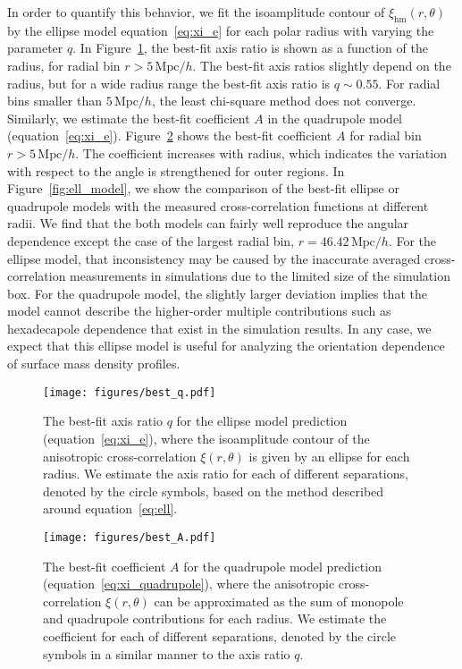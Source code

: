 \documentclass[a4paper,fleqn,usenatbib]{mnras}
\newcommand{\Mpc}{\mathrm{Mpc}}
\newcommand{\rmhm}{\mathrm{hm}}
\begin{document}
In order to quantify this behavior,
we fit the isoamplitude contour of $\xi_\rmhm (r, \theta)$
by the ellipse model equation~\eqref{eq:xi_e}
for each polar radius with varying the parameter $q$.
In Figure~\ref{fig:best_q}, the best-fit axis ratio is
shown as a function of the radius, for radial bin $r > 5\,\Mpc/h$.
The best-fit axis ratios slightly depend on the
radius, but for a wide radius range the best-fit axis ratio is $q \sim 0.55$.
For radial bins smaller than $5\,\Mpc/h$,
the least chi-square method does not converge.
Similarly, we estimate the best-fit coefficient $A$
in the quadrupole model (equation~\ref{eq:xi_e}).
Figure~\ref{fig:best_A} shows the best-fit coefficient $A$
for radial bin $r > 5\,\Mpc/h$.
The coefficient increases with radius,
which indicates the variation with respect to the angle
is strengthened for outer regions.
In Figure~\ref{fig:ell_model}, we show the comparison of
the best-fit ellipse or quadrupole models with
the measured cross-correlation functions at different radii.
We find that the both models can fairly well reproduce the angular dependence
except the case of the largest radial bin,
$r = 46.42 \,\Mpc/h$. For the ellipse model,
that inconsistency may be caused by the
inaccurate averaged cross-correlation measurements in simulations due
to the limited size of the simulation box.
For the quadrupole model,
the slightly larger deviation implies that the model cannot describe the higher-order multiple
contributions such as hexadecapole dependence that exist in the simulation results.
In any case, we expect that this ellipse model is useful for analyzing
the orientation dependence of surface mass density profiles.

\begin{figure}
\texttt{[image: figures/best\_q.pdf]}
\caption{The best-fit axis ratio $q$
for the ellipse model prediction (equation~\ref{eq:xi_e}),
where the isoamplitude contour of
the anisotropic cross-correlation $\xi(r, \theta)$ is given by
an ellipse for each radius. We estimate the axis ratio for each of
different separations, denoted by the circle symbols,
based on the method described around equation~\eqref{eq:ell}.}
\label{fig:best_q}
\end{figure}

\begin{figure}
\texttt{[image: figures/best\_A.pdf]}
\caption{The best-fit coefficient $A$
for the quadrupole model prediction (equation~\ref{eq:xi_quadrupole}),
where the anisotropic cross-correlation $\xi(r, \theta)$ can be approximated
as the sum of monopole and quadrupole contributions for each radius.
We estimate the coefficient for each of different separations,
denoted by the circle symbols in a similar manner to the axis ratio $q$.}
\label{fig:best_A}
\end{figure}
\end{document}
